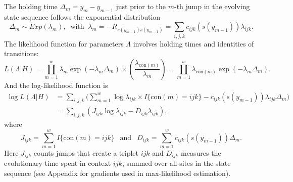 \documentclass[11pt]{article}
\newcommand{\context}[1]{\ensuremath{\mathrm{con}(#1)}}
\begin{document}
The holding time $\Delta_m = y_{m} - y_{m-1}$ just prior to the $m$-th
jump in the evolving state sequence follows the exponential
distribution
\[
\Delta_m \sim \mathit{Exp}(\lambda_m), ~\text{ with }~
\lambda_{m} = -R_{s(y_{m-1})s(y_{m-1})} = \sum_{i,j,k}c_{ijk}(s(y_{m-1}))\lambda_{ijk}.
\]
The likelihood function for parameters $\Lambda$ involves holding times and
identities of transitions:
\begin{equation}\label{eqn:lik}
  L(\Lambda | H) = \prod_{m=1}^{w} \lambda_{m} \exp(-\lambda_{m}\Delta_m)
  \times {\textstyle\left(\frac{\lambda_{\context{m}}}{\lambda_m}\right)}
  =\prod_{m=1}^{w}\lambda_{\context{m}}\exp(-\lambda_m\Delta_m).
\end{equation}
And the log-likelihood function is
\begin{equation}\label{eqn:loglik}
  \begin{array}{ll}
    \log L(\Lambda | H) & = \sum_{i,j,k} \Big(\sum_{m=1}^w\log\lambda_{ijk}\times I{\{\context{m} = ijk\}} - c_{ijk}(s(y_{m-1}))\lambda_{ijk}\Delta_m\Big)\\[1em]
    & = \sum_{i,j,k} \left(J_{ijk}\log\lambda_{ijk} - D_{ijk}\lambda_{ijk} \right),
  \end{array}
\end{equation}
where
\begin{equation}\label{def:JD}
J_{ijk} = \sum_{m=1}^w I\{\context{m} = ijk\}
~~\mbox{ and }~~
D_{ijk} = \sum_{m=1}^w c_{ijk}(s(y_{m-1}))\Delta_m.
\end{equation}
Here $J_{ijk}$ counts jumps that create a triplet $ijk$ and $D_{ijk}$
measures the evolutionary time spent in context $ijk$, summed over all
sites in the state sequence (see Appendix for gradients used in
max-likelihood estimation).

\end{document}
